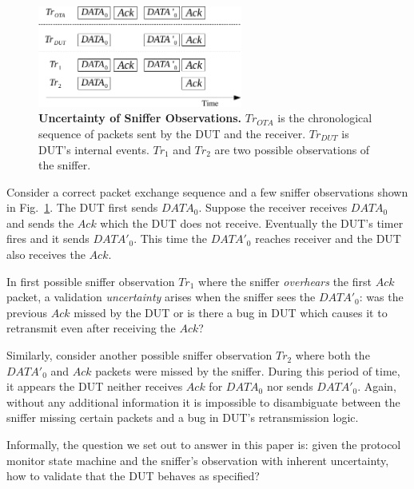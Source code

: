 \begin{figure}[h!]
  \centering
  \includegraphics[width=0.6\textwidth]{./figures/false_pos.pdf}
  \caption{\textbf{Uncertainty of Sniffer Observations.} $Tr_{OTA}$ is
    the chronological sequence of packets sent by the DUT and the receiver.
    $Tr_{DUT}$ is DUT's internal events. $Tr_1$ and $Tr_2$ are two possible observations
  of the sniffer.}
  \label{fig:sniffer_in_middle}
\end{figure}

Consider a correct packet exchange sequence and a few sniffer observations
shown in Fig.~\ref{fig:sniffer_in_middle}. The DUT first sends
$DATA_0$.  Suppose the receiver receives $DATA_0$ and sends the $Ack$ which the
DUT does not receive. Eventually the DUT's timer fires and it sends $DATA'_0$.
This time the $DATA'_0$ reaches receiver and the DUT also receives the $Ack$.

In first possible sniffer observation $Tr_1$ where the sniffer
\textit{overhears} the first $Ack$ packet, a validation \textit{uncertainty}
arises when the sniffer sees the $DATA'_0$: was the previous $Ack$ missed by the
DUT or is there a bug in DUT which causes it to retransmit even after receiving
the $Ack$?

Similarly, consider another possible sniffer observation $Tr_2$
where both the $DATA'_0$ and $Ack$ packets were missed by the sniffer.  During
this period of time, it appears the DUT neither receives $Ack$ for $DATA_0$ nor
sends $DATA'_0$.  Again, without any additional information it is impossible to
disambiguate between the sniffer missing certain packets and a bug in DUT's
retransmission logic.

Informally, the question we set out to answer in this paper is: given the
protocol monitor state machine and the sniffer's
observation with inherent uncertainty, how to validate that the DUT behaves as
specified?
